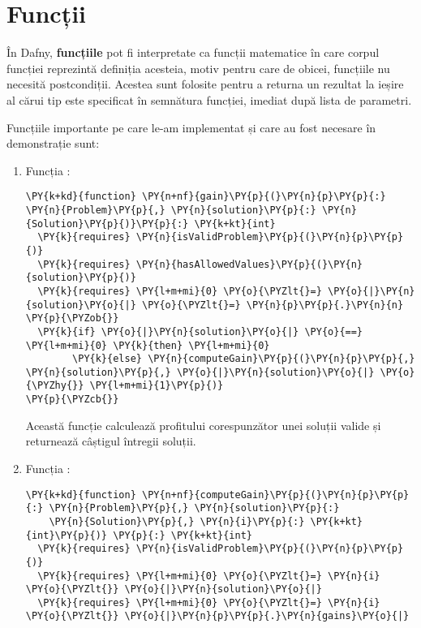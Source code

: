 \begin{sloppypar}
\section{Funcții}
În Dafny, \textbf{funcțiile} pot fi interpretate ca funcții matematice în care corpul funcției reprezintă definiția acesteia, motiv pentru care de obicei, funcțiile nu necesită postcondiții. \cite{DBLP:series/natosec/KoenigL12} Acestea sunt folosite pentru a returna un rezultat la ieșire al cărui tip este specificat în semnătura funcției, imediat după lista de parametri. \par 
Funcțiile importante pe care le-am implementat și care au fost necesare în demonstrație sunt:
\begin{enumerate}
    \item Funcția :
    \begin{Verbatim}[commandchars=\\\{\}]
\PY{k+kd}{function} \PY{n+nf}{gain}\PY{p}{(}\PY{n}{p}\PY{p}{:} \PY{n}{Problem}\PY{p}{,} \PY{n}{solution}\PY{p}{:} \PY{n}{Solution}\PY{p}{)}\PY{p}{:} \PY{k+kt}{int}
  \PY{k}{requires} \PY{n}{isValidProblem}\PY{p}{(}\PY{n}{p}\PY{p}{)}
  \PY{k}{requires} \PY{n}{hasAllowedValues}\PY{p}{(}\PY{n}{solution}\PY{p}{)}
  \PY{k}{requires} \PY{l+m+mi}{0} \PY{o}{\PYZlt{}=} \PY{o}{|}\PY{n}{solution}\PY{o}{|} \PY{o}{\PYZlt{}=} \PY{n}{p}\PY{p}{.}\PY{n}{n}
\PY{p}{\PYZob{}}
  \PY{k}{if} \PY{o}{|}\PY{n}{solution}\PY{o}{|} \PY{o}{==} \PY{l+m+mi}{0} \PY{k}{then} \PY{l+m+mi}{0} 
        \PY{k}{else} \PY{n}{computeGain}\PY{p}{(}\PY{n}{p}\PY{p}{,} \PY{n}{solution}\PY{p}{,} \PY{o}{|}\PY{n}{solution}\PY{o}{|} \PY{o}{\PYZhy{}} \PY{l+m+mi}{1}\PY{p}{)}
\PY{p}{\PYZcb{}}
\end{Verbatim}
    Această funcție calculează profitului corespunzător unei soluții valide și returnează câștigul întregii soluții.
    \item Funcția :
    \begin{Verbatim}[commandchars=\\\{\}]
\PY{k+kd}{function} \PY{n+nf}{computeGain}\PY{p}{(}\PY{n}{p}\PY{p}{:} \PY{n}{Problem}\PY{p}{,} \PY{n}{solution}\PY{p}{:} 
    \PY{n}{Solution}\PY{p}{,} \PY{n}{i}\PY{p}{:} \PY{k+kt}{int}\PY{p}{)} \PY{p}{:} \PY{k+kt}{int}
  \PY{k}{requires} \PY{n}{isValidProblem}\PY{p}{(}\PY{n}{p}\PY{p}{)}
  \PY{k}{requires} \PY{l+m+mi}{0} \PY{o}{\PYZlt{}=} \PY{n}{i} \PY{o}{\PYZlt{}} \PY{o}{|}\PY{n}{solution}\PY{o}{|}
  \PY{k}{requires} \PY{l+m+mi}{0} \PY{o}{\PYZlt{}=} \PY{n}{i} \PY{o}{\PYZlt{}} \PY{o}{|}\PY{n}{p}\PY{p}{.}\PY{n}{gains}\PY{o}{|}

\end{Verbatim}
\end{enumerate}
\end{sloppypar}
